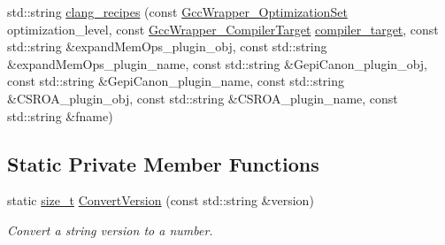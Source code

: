 \begin{DoxyCompactItemize}
std\+::string \hyperlink{classGccWrapper_a22a070d6d7a5770090dc5a119e4fc0bc}{clang\+\_\+recipes} (const \hyperlink{gcc__wrapper_8hpp_a0f57d29a8e8442ddf6d2cd8577c6788d}{Gcc\+Wrapper\+\_\+\+Optimization\+Set} optimization\+\_\+level, const \hyperlink{gcc__wrapper_8hpp_abb9d9a5cb3a1bf5d402dbc841a6708aa}{Gcc\+Wrapper\+\_\+\+Compiler\+Target} \hyperlink{classGccWrapper_a1f804f17bfd3b629339dd13a908560dd}{compiler\+\_\+target}, const std\+::string \&expand\+Mem\+Ops\+\_\+plugin\+\_\+obj, const std\+::string \&expand\+Mem\+Ops\+\_\+plugin\+\_\+name, const std\+::string \&Gepi\+Canon\+\_\+plugin\+\_\+obj, const std\+::string \&Gepi\+Canon\+\_\+plugin\+\_\+name, const std\+::string \&C\+S\+R\+O\+A\+\_\+plugin\+\_\+obj, const std\+::string \&C\+S\+R\+O\+A\+\_\+plugin\+\_\+name, const std\+::string \&fname)
\end{DoxyCompactItemize}
\subsection*{Static Private Member Functions}
\begin{DoxyCompactItemize}
\item 
static \hyperlink{tutorial__fpt__2017_2intro_2sixth_2test_8c_a7c94ea6f8948649f8d181ae55911eeaf}{size\+\_\+t} \hyperlink{classGccWrapper_a49f7bc99f88ca39191d6dc27bb658097}{Convert\+Version} (const std\+::string \&version)
\begin{DoxyCompactList}\small\item\em Convert a string version to a number. \end{DoxyCompactList}\end{DoxyCompactItemize}
